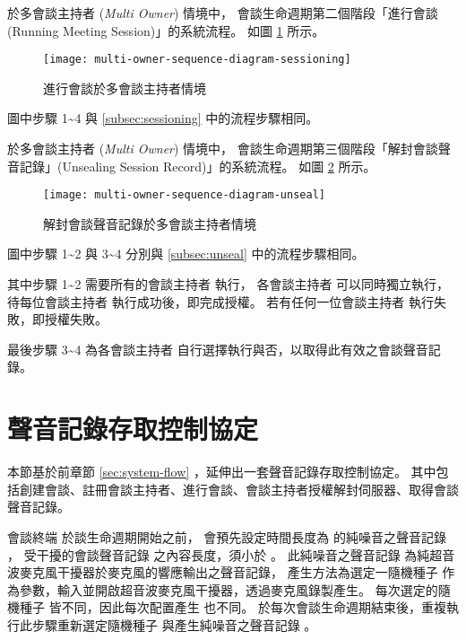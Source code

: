     於多會談主持者 ({\it Multi Owner}) 情境中，
會談生命週期第二個階段「進行會談 (Running Meeting Session)」的系統流程。
如圖 \ref{fig:m-o-sessioning} 所示。

\begin{figure}[H]
    \centering
    \texttt{[image: multi-owner-sequence-diagram-sessioning]}
    \caption{進行會談於多會談主持者情境}\label{fig:m-o-sessioning}
\end{figure}

    圖中步驟 1\textasciitilde4 與
 \ref{subsec:sessioning}  中的流程步驟相同。

    於多會談主持者 ({\it Multi Owner}) 情境中，
會談生命週期第三個階段「解封會談聲音記錄」(Unsealing Session Record)」的系統流程。
如圖 \ref{fig:m-o-unseal} 所示。

\begin{figure}[H]
    \centering
    \texttt{[image: multi-owner-sequence-diagram-unseal]}
    \caption{解封會談聲音記錄於多會談主持者情境}\label{fig:m-o-unseal}
\end{figure}

    圖中步驟 1\textasciitilde2 與 3\textasciitilde4
分別與 \ref{subsec:unseal}  中的流程步驟相同。

    其中步驟 1\textasciitilde2 需要所有的會談主持者 \DEFownerAll 執行，
各會談主持者 \DEFowner 可以同時獨立執行，待每位會談主持者 \DEFowner 執行成功後，即完成授權。
若有任何一位會談主持者 \DEFowner 執行失敗，即授權失敗。

    最後步驟 3\textasciitilde4 為各會談主持者 \DEFowner 自行選擇執行與否，以取得此有效之會談聲音記錄。


\section{聲音記錄存取控制協定}\label{sec:protocol}

    本節基於前章節 \ref{sec:system-flow} ，延伸出一套聲音記錄存取控制協定。
其中包括創建會談、註冊會談主持者、進行會談、會談主持者授權解封伺服器、取得會談聲音記錄。

    會談終端 \DEFmeetingbox 於談生命週期開始之前，
會預先設定時間長度為 \DEFtimeMAX 的純噪音之聲音記錄 \DEFrecN，
受干擾的會談聲音記錄 \DEFrecJ 之內容長度，須小於 \DEFtimeMAX。
此純噪音之聲音記錄 \DEFrecN 為純超音波麥克風干擾器於麥克風的響應輸出之聲音記錄，
產生方法為選定一隨機種子 \DEFseed 作為參數，輸入並開啟超音波麥克風干擾器，透過麥克風錄製產生。
每次選定的隨機種子 \DEFseed 皆不同，因此每次配置產生 \DEFrecN 也不同。
於每次會談生命週期結束後，重複執行此步驟重新選定隨機種子 \DEFseed 與產生純噪音之聲音記錄 \DEFrecN。


